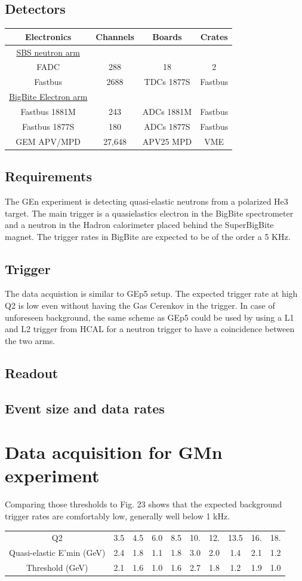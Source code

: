 \documentclass{article}
\begin{document}
\subsection{Detectors}
\begin{tabular}{|c|c|c|c|}
\hline
\hline
Electronics & Channels& Boards & Crates \\
\hline
\underline{SBS neutron arm} & & & \\
FADC & 288 & 18 & 2\\
Fastbus & 2688 & TDCs 1877S&Fastbus\\
\hline
\underline{BigBite Electron arm} & & & \\
Fastbus 1881M & 243 & ADCs 1881M&Fastbus\\
Fastbus 1877S & 180& ADCs 1877S&Fastbus\\
GEM APV/MPD & 27,648 & APV25 MPD &VME\\
\hline
\end{tabular}

\subsection{Requirements}
The GEn experiment is detecting quasi-elastic neutrons from a polarized He3 target. The main trigger is a quasielastics electron in the BigBite spectrometer and  a neutron in the Hadron calorimeter placed behind the SuperBigBite magnet.
The trigger rates in BigBite are expected to be of the order a 5 KHz.


\subsection{Trigger}
The data acquistion is similar to GEp5 setup.
The expected trigger rate at high Q2 is low even without having the Gas Cerenkov in the trigger.
In case of unforeseen background, the same scheme as GEp5 could be used by using a L1 and L2 trigger from HCAL for a neutron trigger
to have a coincidence between the two arms.

\subsection{Readout}

\subsection{Event size and data rates}
\section{Data acquisition for GMn experiment}
Comparing those thresholds
to Fig. 23 shows that the expected background trigger rates are comfortably low, generally well
below 1 kHz.
\begin{tabular}{cccccccccc}
Q2& 3.5& 4.5& 6.0& 8.5& 10.& 12.& 13.5& 16.& 18.\\
Quasi-elastic E’min (GeV)& 2.4 &1.8& 1.1& 1.8& 3.0& 2.0& 1.4& 2.1& 1.2\\
Threshold (GeV)& 2.1& 1.6 &1.0& 1.6& 2.7& 1.8& 1.2& 1.9& 1.0\\
\end{tabular}
\end{document}
